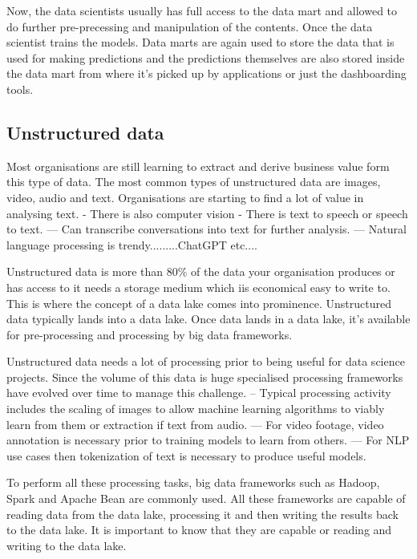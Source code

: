 \documentclass[a4paper, 11pt]{article}
\begin{document}
    Now, the data scientists usually has full access to the data mart and allowed to do further pre-precessing and manipulation of the contents.
    Once the data scientist trains the models.
    Data marts are again used to store the data that is used for making predictions and the predictions themselves are also stored inside the data mart from where it's picked up by applications or just the dashboarding tools.

    \subsection{Unstructured data}
    Most organisations are still learning to extract and derive business value form this type of data.
    The most common types of unstructured data are images, video, audio and text.
    Organisations are starting to find a lot of value in analysing text.
    - There is also computer vision
    - There is text to speech or speech to text.
    --- Can transcribe conversations into text for further analysis.
    --- Natural language processing is trendy.........ChatGPT etc....

    Unstructured data is more than 80\% of the data your organisation produces or has access to it needs a storage medium which iis economical easy to write to.
    This is where the concept of a data lake comes into prominence.
    Unstructured data typically lands into a data lake.
    Once data lands in a data lake, it's available for pre-processing and processing by big data frameworks.

    Unstructured data needs a lot of processing prior to being useful for data science projects.
    Since the volume of this data is huge specialised processing frameworks have evolved over time to manage this challenge.
    -- Typical processing activity includes the scaling of images to allow machine learning algorithms to viably learn from them or extraction if text from audio.
    --- For video footage, video annotation is necessary prior to training models to learn from others.
    --- For NLP use cases then tokenization of text is necessary to produce useful models.

    To perform all these processing tasks, big data frameworks such as Hadoop, Spark and Apache Bean are commonly used.
    All these frameworks are capable of reading data from the data lake, processing it and then writing the results back to the data lake.
    It is important to know that they are capable or reading and writing to the data lake.
\end{document}

